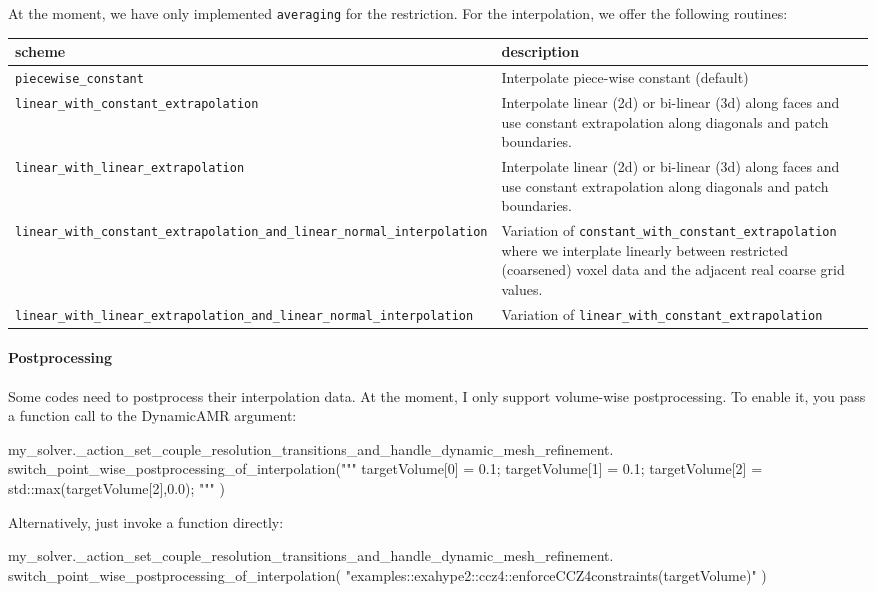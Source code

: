 At the moment, we have only implemented \texttt{averaging} for the restriction. 
For the interpolation, we offer the following routines:

\begin{center}
 \begin{tabular}{l|p{8cm}}
  {\bf scheme} & description \\
  \hline
  \texttt{piecewise\_constant} & Interpolate piece-wise constant (default) \\
  \texttt{linear\_with\_constant\_extrapolation} & Interpolate linear (2d) or
  bi-linear (3d) along faces and use constant extrapolation along diagonals and
  patch boundaries.
  \\
  \texttt{linear\_with\_linear\_extrapolation} & Interpolate linear (2d) or
  bi-linear (3d) along faces and use constant extrapolation along diagonals and
  patch boundaries.
  \\
  \texttt{linear\_with\_constant\_extrapolation\_and\_linear\_normal\_interpolation}
  & Variation of \texttt{constant\_with\_constant\_extrapolation} where we
  interplate linearly between restricted (coarsened) voxel data and the adjacent real
  coarse grid values. 
  \\
  \texttt{linear\_with\_linear\_extrapolation\_and\_linear\_normal\_interpolation}
  & Variation of \texttt{linear\_with\_constant\_extrapolation} 
  \\
 \end{tabular}
\end{center}


\paragraph{Postprocessing}
%
%
%
Some codes need to postprocess their interpolation data. At the moment, I only support volume-wise postprocessing.
To enable it, you pass a function call to the DynamicAMR argument: 
\begin{code}
my_solver._action_set_couple_resolution_transitions_and_handle_dynamic_mesh_refinement.
  switch_point_wise_postprocessing_of_interpolation("""
  targetVolume[0] = 0.1;
  targetVolume[1] = 0.1;
  targetVolume[2] = std::max(targetVolume[2],0.0);
  """ )
\end{code}

\noindent
Alternatively, just invoke a function directly:

\begin{code}
my_solver._action_set_couple_resolution_transitions_and_handle_dynamic_mesh_refinement.
  switch_point_wise_postprocessing_of_interpolation(
  "examples::exahype2::ccz4::enforceCCZ4constraints(targetVolume)" )
\end{code}

